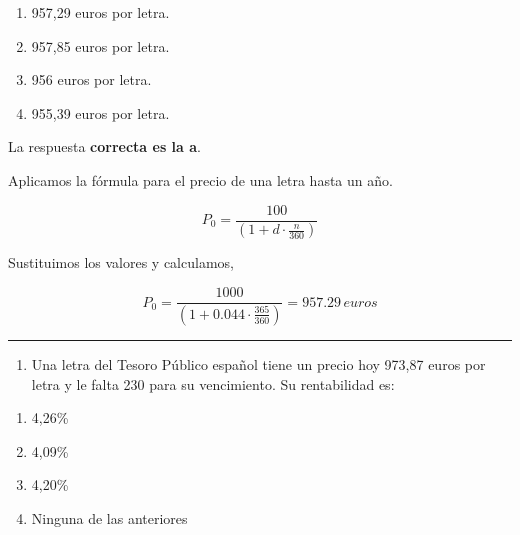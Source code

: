 \documentclass[
  letterpaper,
  DIV=11,
  numbers=noendperiod]{scrreprt}
\providecommand{\tightlist}{%
  \setlength{\itemsep}{0pt}\setlength{\parskip}{0pt}}\usepackage{longtable,booktabs,array}
\begin{document}
\begin{enumerate}
\def\labelenumi{\alph{enumi}.}
\item
  957,29 euros por letra.
\item
  957,85 euros por letra.
\item
  956 euros por letra.
\item
  955,39 euros por letra.
\end{enumerate}

\begin{tcolorbox}[enhanced jigsaw, left=2mm, opacityback=0, colback=white, breakable, arc=.35mm, bottomrule=.15mm, rightrule=.15mm, toprule=.15mm, leftrule=.75mm, colframe=quarto-callout-tip-color-frame]
\begin{minipage}[t]{5.5mm}
\textcolor{quarto-callout-tip-color}{\faLightbulb}
\end{minipage}%
\begin{minipage}[t]{\textwidth - 5.5mm}

La respuesta \textbf{correcta es la a}.

Aplicamos la fórmula para el precio de una letra hasta un año.

\[P_0=\frac{100}{\left(1+d\cdot\frac{n}{360}\right)}\]

Sustituimos los valores y calculamos,

\[P_0=\frac{1000}{\left(1+0.044\cdot\frac{365}{360}\right)}=957.29\,euros\]

\end{minipage}%
\end{tcolorbox}

\begin{center}\rule{0.5\linewidth}{0.5pt}\end{center}

\begin{enumerate}
\def\labelenumi{\arabic{enumi}.}
\setcounter{enumi}{7}
\tightlist
\item
  Una letra del Tesoro Público español tiene un precio hoy 973,87 euros
  por letra y le falta 230 para su vencimiento. Su rentabilidad es:
\end{enumerate}

\begin{enumerate}
\def\labelenumi{\alph{enumi}.}
\item
  4,26\%
\item
  4,09\%
\item
  4,20\%
\item
  Ninguna de las anteriores
\end{enumerate}
\end{document}
